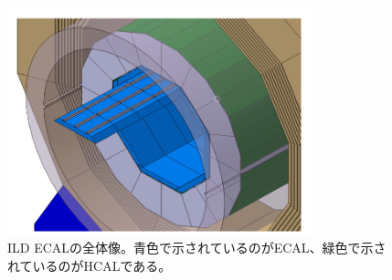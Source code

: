 \begin{figure}[H]
	\begin{center}
		\includegraphics[width=250pt]{./Figure/EcalDetector/ILD_det_3D.png}
		\caption[ILD・ECALの全体像]{ILD ECALの全体像。青色で示されているのがECAL、緑色で示されているのがHCALである。}
		\label{SiW Ecal}
	\end{center}
\end{figure}


